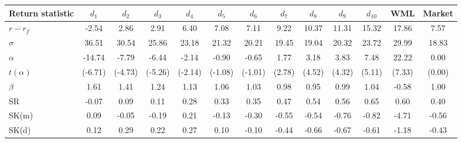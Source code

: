 \begin{tabular}{lcccccccccccc}
\toprule
Return statistic & $d_{1}$ & $d_{2}$ & $d_{3}$ & $d_{4}$ & $d_{5}$ & $d_{6}$ & $d_{7}$ & $d_{8}$ & $d_{9}$ & $d_{10}$ & WML & Market \\
\midrule
$\overline{r - r_f}$ & -2.54 & 2.86 & 2.91 & 6.40 & 7.08 & 7.11 & 9.22 & 10.37 & 11.31 & 15.32 & 17.86 & 7.57 \\
$\sigma$ & 36.51 & 30.54 & 25.86 & 23.18 & 21.32 & 20.21 & 19.45 & 19.04 & 20.32 & 23.72 & 29.99 & 18.83 \\
$\alpha$ & -14.74 & -7.79 & -6.44 & -2.14 & -0.90 & -0.65 & 1.77 & 3.18 & 3.83 & 7.48 & 22.22 & 0.00 \\
$t(\alpha)$ & (-6.71) & (-4.73) & (-5.26) & (-2.14) & (-1.08) & (-1.01) & (2.78) & (4.52) & (4.32) & (5.11) & (7.33) & (0.00) \\
$\beta$ & 1.61 & 1.41 & 1.24 & 1.13 & 1.06 & 1.03 & 0.98 & 0.95 & 0.99 & 1.04 & -0.58 & 1.00 \\
SR & -0.07 & 0.09 & 0.11 & 0.28 & 0.33 & 0.35 & 0.47 & 0.54 & 0.56 & 0.65 & 0.60 & 0.40 \\
SK(m) & 0.09 & -0.05 & -0.19 & 0.21 & -0.13 & -0.30 & -0.55 & -0.54 & -0.76 & -0.82 & -4.71 & -0.56 \\
SK(d) & 0.12 & 0.29 & 0.22 & 0.27 & 0.10 & -0.10 & -0.44 & -0.66 & -0.67 & -0.61 & -1.18 & -0.43 \\
\bottomrule
\end{tabular}
